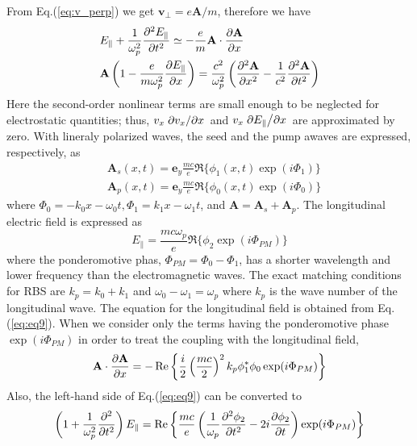 \documentclass{article}
\begin{document}
    From Eq.(\ref{eq:v_perp}) we get $\mathbf{v}_{\perp}=e\mathbf{A}/m$, therefore we have
    \begin{align}
        &E_{\parallel} + \frac{1}{\omega_p^2}\pdv[2]{E_{\parallel}}{t} \simeq - \frac{e}{m}\mathbf{A}\cdot\pdv{\mathbf{A}}{x} \label{eq:eq9} \\
        &\mathbf{A}\left( 1 - \frac{e}{m\omega_p^2}\pdv{E_{\parallel}}{x} \right) = \frac{c^2}{\omega_p^2}\left( \pdv[2]{\mathbf{A}}{x} - \frac{1}{c^2}\pdv[2]{\mathbf{A}}{t} \right) \label{eq:eq10}
    \end{align}
    Here the second-order nonlinear terms are small enough to be neglected for electrostatic quantities; thus, $v_x\pdv*{v_x}{x}$ and $v_x\pdv*{E_{\parallel}}{x}$ are approximated by zero.
    With lineraly polarized waves, the seed and the pump awaves are expressed, respectively, as
    \begin{align}
        &\mathbf{A}_s(x,t) = \mathbf{e}_y\frac{mc}{e}\Re\{ \phi_1(x,t)\exp(i\Phi_1) \} \\
        &\mathbf{A}_p(x,t) = \mathbf{e}_y\frac{mc}{e}\Re\{ \phi_0(x,t)\exp(i\Phi_0) \}
    \end{align}
    where $\Phi_0=-k_0x-\omega_0t, \Phi_1=k_1x-\omega_1t$, and $\mathbf{A}=\mathbf{A}_s+\mathbf{A}_p$. The longitudinal electric field is expressed as 
    \begin{equation}
        E_{\parallel} = \frac{mc\omega_p}{e} \Re \{ \phi_2\exp(i\Phi_{PM}) \}
    \end{equation}
    where the ponderomotive phas, $\Phi_{PM}=\Phi_0-\Phi_1$, has a shorter wavelength and lower frequency than the electromagnetic waves. The exact matching conditions for RBS are $k_p=k_0+k_1$ and $\omega_0-\omega_1=\omega_p$ where $k_p$ is the wave number of the longitudinal wave.
    The equation for the longitudinal field is obtained from Eq.(\ref{eq:eq9}). When we consider only the terms having the ponderomotive phase $\exp(i\Phi_{PM})$ in order to treat the coupling with the longitudinal field,
    \begin{equation}
        \mathbf{A}\cdot\pdv{\mathbf{A}}{x} = -\Re\left\{ \frac{i}{2}\left(\frac{mc}{2}\right)^2 k_p\phi_1^*\phi_0\exp(i\Phi_{PM}) \right\}
    \end{equation}
    Also, the left-hand side of Eq.(\ref{eq:eq9}) can be converted to
    \begin{equation}
        \left( 1 + \frac{1}{\omega_p^2}\pdv[2]{t} \right)E_{\parallel} = \Re\left\{ \frac{mc}{e}\left(\frac{1}{\omega_p}\pdv[2]{\phi_2}{t} - 2i\pdv{\phi_2}{t} \right)\exp(i\Phi_{PM}) \right\}
    \end{equation}
\end{document}
